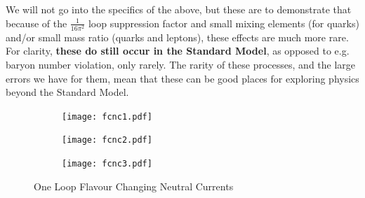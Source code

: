 \documentclass[relqm.tex]{subfiles}
\begin{document}
We will not go into the specifics of the above, but these are to demonstrate that because of the $\frac{1}{16\pi^2}$ loop suppression factor and small mixing elements (for quarks) and/or small mass ratio (quarks and leptons), these effects are much more rare. 
For clarity, \textbf{these do still occur in the Standard Model}, as opposed to e.g. baryon number violation, only rarely. 
The rarity of these processes, and the large errors we have for them, mean that these can be good places for exploring physics beyond the Standard Model. 
\begin{figure}[H]
    \centering
    \begin{subfigure}[b]{0.3\textwidth}
        \centering
        \texttt{[image: fcnc1.pdf]}
        \caption{}
    \end{subfigure}
    \begin{subfigure}[b]{0.3\textwidth}
        \centering
        \texttt{[image: fcnc2.pdf]}
        \caption{}
    \end{subfigure}
    \begin{subfigure}[b]{0.3\textwidth}
        \centering
        \texttt{[image: fcnc3.pdf]}
        \caption{}
    \end{subfigure}
    \caption{One Loop Flavour Changing Neutral Currents}
\end{figure}
\end{document}
